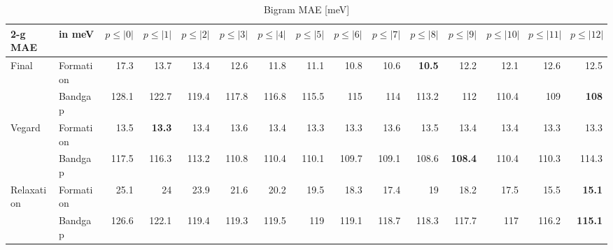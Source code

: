 \documentclass[11pt,oneside,czech,american]{book} %
\theoremstyle{definition} %
\theoremstyle{definition}
\begin{document}
\begin{table}[H]
	\scriptsize
	\centering
\begin{tabular}{llrrrrrrrrrrrrr}
	\hline
	2-g MAE    & in meV   &   $p{\leq}|0|$ &   $p{\leq}|1|$ &   $p{\leq}|2|$ &   $p{\leq}|3|$ &   $p{\leq}|4|$ &   $p{\leq}|5|$ &   $p{\leq}|6|$ &   $p{\leq}|7|$ &   $p{\leq}|8|$ &   $p{\leq}|9|$ &   $p{\leq}|10|$ &   $p{\leq}|11|$ &   $p{\leq}|12|$ \\
	\hline
	\multirow{2}{*}{Final}      & Formation &       17.3 &       13.7 &       13.4 &       12.6 &       11.8 &       11.1 &       10.8 &       10.6 &       \textbf{10.5} &       12.2 &        12.1 &        12.6 &        12.5 \\
	      & Bandgap   &      128.1 &      122.7 &      119.4 &      117.8 &      116.8 &      115.5 &      115   &      114   &      113.2 &      112   &       110.4 &       109   &       \textbf{108}   \\
	\multirow{2}{*}{Vegard}     & Formation &       13.5 &       \textbf{13.3} &       13.4 &       13.6 &       13.4 &       13.3 &       13.3 &       13.6 &       13.5 &       13.4 &        13.4 &        13.3 &        13.3 \\
	     & Bandgap   &      117.5 &      116.3 &      113.2 &      110.8 &      110.4 &      110.1 &      109.7 &      109.1 &      108.6 &      \textbf{108.4} &       110.4 &       110.3 &       114.3 \\
	\multirow{2}{*}{Relaxation} & Formation &       25.1 &       24   &       23.9 &       21.6 &       20.2 &       19.5 &       18.3 &       17.4 &       19   &       18.2 &        17.5 &        15.5 &        \textbf{15.1} \\
	 & Bandgap   &      126.6 &      122.1 &      119.4 &      119.3 &      119.5 &      119   &      119.1 &      118.7 &      118.3 &      117.7 &       117   &       116.2 &       \textbf{115.1} \\
	\hline
\end{tabular}
	\caption{Bigram MAE [meV]}
	\label{2-g MAE hat}
\end{table}
\end{document}

